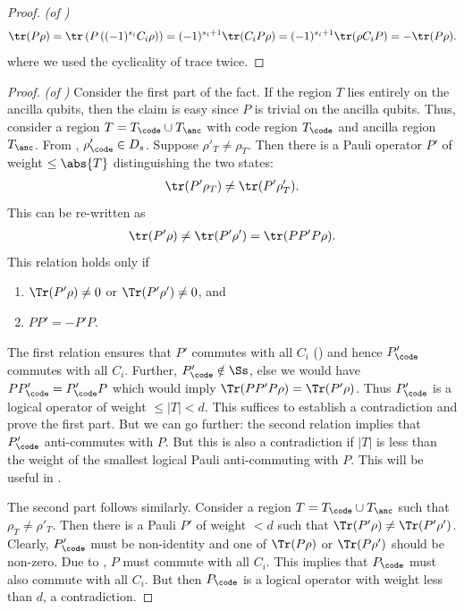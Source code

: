 \documentclass{toc}
\begin{document}
\begin{proof}\textit{(of )}
\begin{align}
    \tr(P \rho) = \tr \left( P \left( (-1)^{s_i} C_i \rho \right) \right) = (-1)^{s_i + 1} \tr(C_i P \rho) = (-1)^{s_i + 1} \tr(\rho C_iP) = - \tr(P \rho).
\end{align}
where we used the cyclicality of trace twice. 
\end{proof}

\begin{proof}\textit{(of )}
Consider the first part of the fact. If the region $T$ lies entirely on the ancilla qubits, then the claim is easy since $P$ is trivial on the ancilla qubits.  Thus, consider a region $T=T_{\code} \cup T_{\anc}$ with code region $T_{\code}$ and ancilla region $T_{\anc}$. From , $\rho'_{\code}\in D_s$. Suppose $\rho'_T\neq \rho_T$. Then there is a Pauli operator $P'$ of weight $\leq \abs{T}$ distinguishing the two states: 
\begin{align}
\tr(P' \rho_T)\neq \tr(P' \rho'_T).
\end{align}
This can be re-written as 
\begin{align}
\tr(P'\rho) \neq \tr(P' \rho') =  \tr(PP' P\rho).    
\end{align}
%
This relation holds only if 
\begin{enumerate}
    \item $\Tr(P' \rho)\neq 0$ or $\Tr(P' \rho')\neq 0$,  and 
    \item $PP'=-P'P$.
\end{enumerate}
The first relation ensures that $P'$ commutes with all $C_i$ () and hence $P'_{\code}$ commutes with all $C_i$. Further, $P'_{\code}\notin \Ss$, else we would have $PP'_{\code}=P'_{\code}P$ which would imply $\Tr(PP' P\rho)=\Tr(P'\rho)$. Thus $P'_{\code}$ is a logical operator of weight $\leq |T|< d$. This suffices to establish a contradiction and prove the first part. But we can go further: the second relation implies that $P'_{\code}$ anti-commutes with $P$. But this is also a contradiction if $|T|$ is less than the weight of the smallest logical Pauli  anti-commuting with $P$. This will be useful in . 

The second part follows similarly. Consider a region $T=T_{\code}\cup T_{\anc}$ such that $\rho_T \neq \rho'_T$. Then there is a Pauli $P'$ of weight $< d$ such that $\Tr(P'\rho)\neq \Tr(P'\rho')$. Clearly, $P'_{\code}$ must be non-identity and one of $\Tr(P\rho)$ or $\Tr(P\rho')$ should be non-zero. Due to , $P$ must commute with all $C_i$. This implies that $P_{\code}$ must also commute with all $C_i$. But then $P_{\code}$ is a logical operator with weight less than $d$, a contradiction.
\end{proof}
\end{document}
